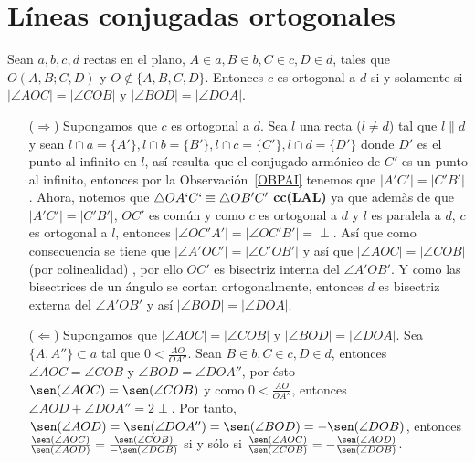 \section{Líneas conjugadas ortogonales}
\begin{teo}
Sean $a,b,c,d$ rectas en el plano, $A\in a, B\in b, C\in c, D\in d$, tales que $O(A,B;C,D)$ y $O\notin\{A,B,C,D\}$. Entonces $c$ es ortogonal a $d$ si y solamente si $|\angle AOC|=|\angle COB|$ y $|\angle BOD|=|\angle DOA|$.
\end{teo}
\begin{dem}
\begin{enumerate}
\item [($\Rightarrow$)] Supongamos que $c$ es ortogonal a $d$. Sea $l$ una recta ($l\neq d$) tal que $l\parallel d$ y sean $l\cap a=\{A'\}, l\cap b=\{B'\}, l\cap c=\{C'\}, l\cap d=\{D'\}$ donde $D'$ es el punto al infinito en $l$, así resulta que el conjugado armónico de $C'$ es un punto al infinito, entonces por la Observación~\ref{OBPAI} tenemos que $|A'C'|=|C'B'|$. Ahora, notemos que $\triangle OA`C`\equiv\triangle OB'C'$ \textbf{cc(LAL)} ya que ademàs de que $|A'C'|=|C'B'|$, $OC'$ es común y  como $c$ es ortogonal a $d$ y $l$ es paralela a $d$, $c$ es ortogonal a $l$, entonces $|\angle OC'A'|=|\angle OC'B'|=\perp$. Así que como consecuencia se tiene que $|\angle A'OC'|=|\angle C'OB'|$ y así que $|\angle AOC|=|\angle COB|$ (por colinealidad) , por ello $OC'$ es bisectriz interna del $\angle A'OB'$. Y como las bisectrices de un ángulo se cortan ortogonalmente, entonces $d$ es bisectriz externa del $\angle A'OB'$ y así $|\angle BOD|=|\angle DOA|$.
\item [($\Leftarrow$)] Supongamos que $|\angle AOC|=|\angle COB|$ y $|\angle BOD|=|\angle DOA|$. Sea $\{A,A''\}\subset a$ tal que $0<\frac{AO}{OA''}$. Sean $B\in b, C\in c, D\in d$, entonces $\angle AOC=\angle COB$ y $\angle BOD=\angle DOA''$, por ésto $\sen(\angle AOC)=\sen(\angle COB)$ y como $0<\frac{AO}{OA''}$, entonces $\angle AOD+\angle DOA''=2\perp$. Por tanto, $\sen(\angle AOD)=\sen(\angle DOA'')=\sen(\angle BOD)=-\sen(\angle DOB)$, entonces $\frac{\sen(\angle AOC)}{\sen(\angle AOD)}=\frac{\sen(\angle COB)}{-\sen(\angle DOB)}$ si y sólo si $\frac{\sen(\angle AOC)}{\sen(\angle COB)}=-\frac{\sen(\angle AOD)}{\sen(\angle DOB)}$.
\end{enumerate}
\end{dem}


